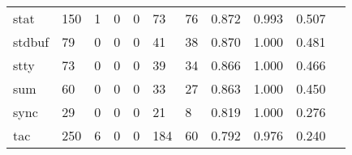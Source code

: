 \begin{longtable}{lp{1.20cm}p{1.20cm}p{1.20cm}p{1.20cm}p{1.20cm}p{1.20cm}p{1.20cm}p{1.20cm}p{1.20cm}p{1.20cm}}
stat      &                                   150 &                                                  1 &                                                  0 &                                                  0 &                                                 73 &                                                 76 &                                         0.872 &                                              0.993 &                                              0.507 \\
stdbuf    &                                    79 &                                                  0 &                                                  0 &                                                  0 &                                                 41 &                                                 38 &                                         0.870 &                                              1.000 &                                              0.481 \\
stty      &                                    73 &                                                  0 &                                                  0 &                                                  0 &                                                 39 &                                                 34 &                                         0.866 &                                              1.000 &                                              0.466 \\
sum       &                                    60 &                                                  0 &                                                  0 &                                                  0 &                                                 33 &                                                 27 &                                         0.863 &                                              1.000 &                                              0.450 \\
sync      &                                    29 &                                                  0 &                                                  0 &                                                  0 &                                                 21 &                                                  8 &                                         0.819 &                                              1.000 &                                              0.276 \\
tac       &                                   250 &                                                  6 &                                                  0 &                                                  0 &                                                184 &                                                 60 &                                         0.792 &                                              0.976 &                                              0.240 \\

\end{longtable}
